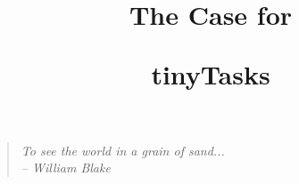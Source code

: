 \documentclass[pdftex,twoside,twocolumn,10pt,letterpaper]{article}
\begin{document}
\title{\vspace{-1in}The Case for \begin{large}tinyTasks\end{large}}
\author{}
\date{}


\maketitle

\begin{quote}
  \textit{To see the world in a grain of sand...}\\
  \textit{-- William Blake}
\end{quote}







\end{document}
